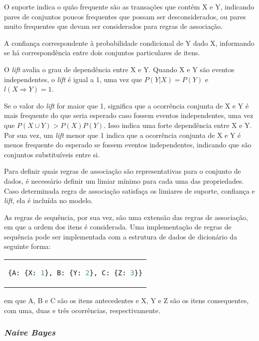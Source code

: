 O suporte indica o quão frequente são as transações que contém X e Y, indicando
pares de conjuntos poucos frequentes que possam ser desconsiderados, ou pares
muito frequentes que devam ser considerados para regras de associação.

A confiança correspondente à probabilidade condicional de Y dado X, informando
se há correspondência entre dois conjuntos particulares de itens.

O \textit{lift} avalia o grau de dependência entre X e Y. Quando X e Y são
eventos independentes, o \textit{lift} é igual a 1, uma vez que $P(Y|X) = P(Y)$ e $l(X
\Rightarrow Y) = 1$.

Se o valor do \textit{lift} for maior que 1, significa que a
ocorrência conjunta de X e Y é mais frequente do que seria esperado caso fossem
eventos independentes, uma vez que $P(X \cup Y) > P(X)P(Y)$. Isso indica uma
forte dependência entre X e Y. Por sua vez, um \textit{lift}  menor que 1 indica
que a ocorrência conjunta de X e Y é menos frequente do esperado se fossem
eventos independentes, indicando que são conjuntos substituíveis entre si.

Para definir quais regras de associação são representativas para o conjunto de
dados, é necessário definir um limiar mínimo para cada uma das propriedades.
Caso determinada regra de associação satisfaça os limiares de suporte,
confiança e \textit{lift}, ela é incluída no modelo.

As regras de sequência, por sua vez, são uma extensão das regras de associação,
em que a ordem dos itens é considerada. Uma implementação de regras de sequência
pode ser implementada com a estrutura de dados de dicionário da seguinte forma:

\begin{center}
    \begin{tabular}{c}

\begin{lstlisting}[language=Python]
    {A: {X: 1}, B: {Y: 2}, C: {Z: 3}}
\end{lstlisting}
\end{tabular}
\end{center}
em que A, B e C são os itens antecedentes e X, Y e Z são os itens consequentes, com
uma, duas e três ocorrências, respectivamente.

\subsubsection{\textit{Naive Bayes}}

